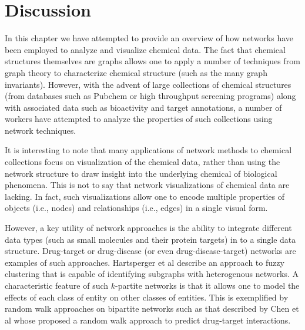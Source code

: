 \documentclass[]{book}
\begin{document}
\section{Discussion}
\label{sec:summary}

In this chapter we have attempted to provide an overview of how
networks have been employed to analyze and visualize chemical
data. The fact that chemical structures themselves are graphs allows
one to apply a number of techniques from graph theory to characterize
chemical structure (such as the many graph invariants). However, with
the advent of large collections of chemical structures (from databases
such as Pubchem or high throughput screening programs) along with
associated data such as bioactivity and target annotations, a number
of workers have attempted to analyze the properties of such
collections using network techniques.

It is interesting to note that many applications of network methods to
chemical collections focus on visualization of the chemical data,
rather than using the network structure to draw insight into the
underlying chemical of biological phenomena. This is not to say that
network visualizations of chemical data are lacking. In fact, such
visualizations allow one to encode multiple properties of objects
(i.e., nodes) and relationships (i.e., edges) in a single visual form. 

However, a key utility of network approaches is the ability to
integrate different data types (such as small molecules and their
protein targets) in to a single data structure. Drug-target or
drug-disease (or even drug-disease-target) networks are examples of
such approaches. Hartsperger et al \cite{Hartsperger:2010yg} describe
an approach to fuzzy clustering that is capable of identifying
subgraphs with heterogenous networks. A characteristic feature of such
$k$-partite networks is that it allows one to model the effects of
each class of entity on other classes of entities. This is exemplified
by random walk approaches on bipartite networks such as that described
by Chen et al \cite{Chen:2012qy} whose proposed a random walk approach
to predict drug-target interactions.


\end{document}
